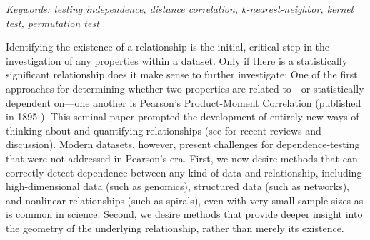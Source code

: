 \documentclass[11pt]{article}
\begin{document}


\noindent%
{\it Keywords: testing independence, distance correlation, k-nearest-neighbor, kernel test, permutation test}

\clearpage
\setcounter{tocdepth}{2}


Identifying the existence of a relationship is the initial, critical step in the investigation of any properties within a dataset. Only if there is a statistically significant relationship does it make sense to further investigate; 
One of the first approaches for determining whether two properties are related to---or statistically dependent on---one another is Pearson's Product-Moment Correlation (published in 1895 \cite{Pearson1895}). This seminal paper prompted the development of  entirely new ways of thinking about and quantifying relationships (see \cite{Reimherr2013,JosseHolmes2013} for  recent reviews and discussion).
Modern datasets, however, present  challenges for dependence-testing that were not addressed in Pearson's era.
First, we now desire methods that can correctly detect dependence between any kind of data and relationship, including high-dimensional data (such as genomics), structured data (such as networks), and nonlinear relationships (such as spirals), even with very small sample sizes as is common in science.  Second, we desire methods that provide deeper insight into the geometry of the underlying relationship, rather than merely its existence.    
\end{document}
